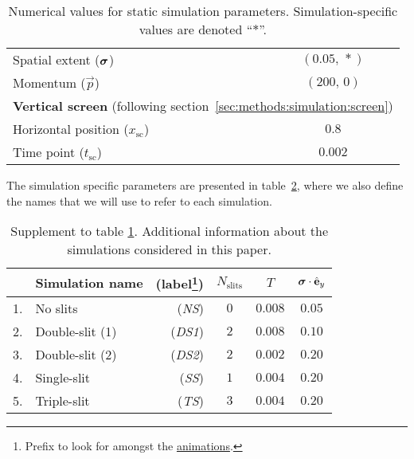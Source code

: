 \begin{table}[ht!]
\begin{tabular}{l|c}
                Spatial extent ($\boldsymbol{\sigma}$)        & $(0.05, \,*)$             \\
                Momentum ($\vec{p}$)                    & $(200,\, 0)$              \\
                \hline
                \multicolumn{2}{l}{\textbf{Vertical screen} (following section~\ref{sec:methods:simulation:screen})} \\
                \hline
                Horizontal position ($x_\mathrm{sc}$)   & $0.8$     \\
                Time point ($t_\mathrm{sc}$)            & $0.002$   \\
                \hline
            \end{tabular}
            \caption{Numerical values for static simulation parameters. Simulation-specific values are denoted ``$*$''.}
            \label{tab:simulation_parameters}
        \end{table}

        The simulation specific parameters are presented in table~\ref{tab:simulations_info}, where we also define the names that we will use to refer to each simulation. 

        \begin{table}[ht!]
            \centering
            \begin{tabular}{clr|ccc}
                \hline
                & Simulation name & (label\footnote{Prefix to look for amongst the \href{\animlink}{animations}.}) & $N_\mathrm{slits}$ & $T$ & $\boldsymbol{\sigma}\cdot \hat{\mathbf{e}}_y$ \\
                \hline
                1. & No slits        & (\textit{NS})   & $0$   & $0.008$   & $0.05$ \\
                2. & Double-slit (1) & (\textit{DS1})  & $2$   & $0.008$   & $0.10$ \\
                3. & Double-slit (2) & (\textit{DS2})  & $2$   & $0.002$   & $0.20$ \\
                4. & Single-slit     & (\textit{SS})   & $1$   & $0.004$   & $0.20$ \\
                5. & Triple-slit     & (\textit{TS})   & $3$   & $0.004$   & $0.20$ \\
                \hline
            \end{tabular}
            \caption{Supplement to table \ref{tab:simulation_parameters}. Additional information about the simulations considered in this paper.}
            \label{tab:simulations_info}
        \end{table}


